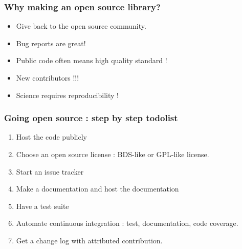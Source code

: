\documentclass[11pt,compress,serif]{beamer}
\begin{document}
\begin{frame}[fragile=singleslide]
\frametitle{Why making an open source library?}
    
\begin{itemize}
\item Give back to the open source community.
\item Bug reports are great!
\item Public code often means high quality standard !
\item New contributors !!! 
\item Science requires reproducibility !
\end{itemize}
    
\end{frame}

\begin{frame}
\frametitle{Going open source : step by step todolist}
    
\begin{enumerate}
\item Host the code publicly
\item Choose an open source license : BDS-like or GPL-like license.
\item Start an issue tracker
\item Make a documentation and host the documentation
\item Have a test suite 
\item Automate continuous integration : test, documentation, code coverage.
\item Get a change log with attributed contribution.
\end{enumerate}
    
\end{frame}
\end{document}

